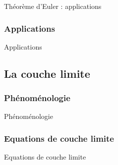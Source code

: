 {\begin{frame}{Théorème d'Euler : applications}
\end{frame}






\subsubsection{Applications}
\begin{frame}{Applications}

\small

\vspace{0mm}

\end{frame}

\subsection{La couche limite}

\subsubsection{Phénoménologie}
\begin{frame}{Phénoménologie}

\small

\vspace{0mm}

\end{frame}

\subsubsection{Equations de couche limite}
\begin{frame}{Equations de couche limite}


\end{frame}}

